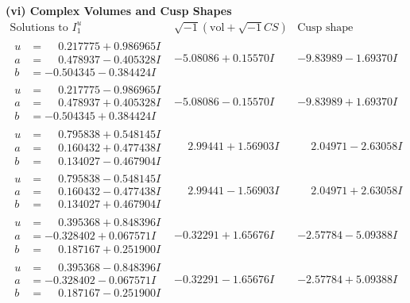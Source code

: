 \documentclass[1p]{elsarticle_modified}
\theoremstyle{definition}
\newcommand{\I}{\sqrt{-1}}
\begin{document}
\newpage\flushleft \textbf{(vi) Complex Volumes and Cusp Shapes}
$$\begin{array}{c|c|c}  
\text{Solutions to }I^u_{1}& \I (\text{vol} + \sqrt{-1}CS) & \text{Cusp shape}\\
 \hline 
\begin{aligned}
u &= \phantom{-}0.217775 + 0.986965 I \\
a &= \phantom{-}0.478937 - 0.405328 I \\
b &= -0.504345 - 0.384424 I\end{aligned}
 & -5.08086 + 0.15570 I & -9.83989 - 1.69370 I \\ \hline\begin{aligned}
u &= \phantom{-}0.217775 - 0.986965 I \\
a &= \phantom{-}0.478937 + 0.405328 I \\
b &= -0.504345 + 0.384424 I\end{aligned}
 & -5.08086 - 0.15570 I & -9.83989 + 1.69370 I \\ \hline\begin{aligned}
u &= \phantom{-}0.795838 + 0.548145 I \\
a &= \phantom{-}0.160432 + 0.477438 I \\
b &= \phantom{-}0.134027 - 0.467904 I\end{aligned}
 & \phantom{-}2.99441 + 1.56903 I & \phantom{-}2.04971 - 2.63058 I \\ \hline\begin{aligned}
u &= \phantom{-}0.795838 - 0.548145 I \\
a &= \phantom{-}0.160432 - 0.477438 I \\
b &= \phantom{-}0.134027 + 0.467904 I\end{aligned}
 & \phantom{-}2.99441 - 1.56903 I & \phantom{-}2.04971 + 2.63058 I \\ \hline\begin{aligned}
u &= \phantom{-}0.395368 + 0.848396 I \\
a &= -0.328402 + 0.067571 I \\
b &= \phantom{-}0.187167 + 0.251900 I\end{aligned}
 & -0.32291 + 1.65676 I & -2.57784 - 5.09388 I \\ \hline\begin{aligned}
u &= \phantom{-}0.395368 - 0.848396 I \\
a &= -0.328402 - 0.067571 I \\
b &= \phantom{-}0.187167 - 0.251900 I\end{aligned}
 & -0.32291 - 1.65676 I & -2.57784 + 5.09388 I \\ \hline\begin{aligned}

\end{aligned}
\end{array}$$
\end{document}
